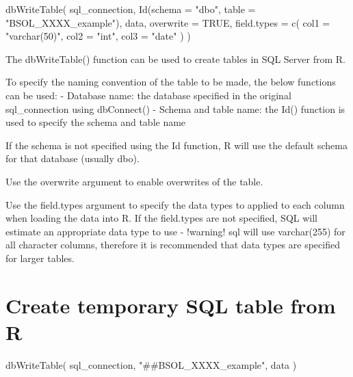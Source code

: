 \documentclass[
]{book}
\newenvironment{Shaded}{\begin{snugshade}}{\end{snugshade}}
\newcommand{\AttributeTok}[1]{\textcolor[rgb]{0.77,0.63,0.00}{#1}}
\newcommand{\ConstantTok}[1]{\textcolor[rgb]{0.00,0.00,0.00}{#1}}
\newcommand{\FunctionTok}[1]{\textcolor[rgb]{0.00,0.00,0.00}{#1}}
\newcommand{\NormalTok}[1]{#1}
\newcommand{\StringTok}[1]{\textcolor[rgb]{0.31,0.60,0.02}{#1}}
\begin{document}
\begin{Shaded}
\begin{Highlighting}[]
\FunctionTok{dbWriteTable}\NormalTok{(}
\NormalTok{  sql\_connection,}
  \FunctionTok{Id}\NormalTok{(}\AttributeTok{schema =} \StringTok{"dbo"}\NormalTok{, }\AttributeTok{table =} \StringTok{"BSOL\_XXXX\_example"}\NormalTok{),}
\NormalTok{  data,}
  \AttributeTok{overwrite =} \ConstantTok{TRUE}\NormalTok{,}
  \AttributeTok{field.types =} \FunctionTok{c}\NormalTok{(}
    \AttributeTok{col1 =} \StringTok{"varchar(50)"}\NormalTok{,}
    \AttributeTok{col2 =} \StringTok{"int"}\NormalTok{,}
    \AttributeTok{col3 =} \StringTok{"date"}
\NormalTok{  )}
\NormalTok{)}
\end{Highlighting}
\end{Shaded}

The dbWriteTable() function can be used to create tables in SQL Server from R.

To specify the naming convention of the table to be made, the below functions can be used:
- Database name: the database specified in the original sql\_connection using dbConnect()
- Schema and table name: the Id() function is used to specify the schema and table name

If the schema is not specified using the Id function, R will use the default schema for that database (usually dbo).

Use the overwrite argument to enable overwrites of the table.

Use the field.types argument to specify the data types to applied to each column when loading the data into R. If the field.types are not specified, SQL will estimate an appropriate data type to use - !warning! sql will use varchar(255) for all character columns, therefore it is recommended that data types are specified for larger tables.

\hypertarget{create-temporary-sql-table-from-r}{%
\section{Create temporary SQL table from R}\label{create-temporary-sql-table-from-r}}

\begin{Shaded}
\begin{Highlighting}[]
\FunctionTok{dbWriteTable}\NormalTok{(}
\NormalTok{  sql\_connection,}
  \StringTok{"\#\#BSOL\_XXXX\_example"}\NormalTok{,}
\NormalTok{  data}
\NormalTok{)}
\end{Highlighting}
\end{Shaded}
\end{document}

